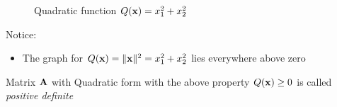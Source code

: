 \begin{frame}
    
    \vspace{2em}
    \begin{figure}
   \begin{center}
    \caption{\label{f:qform_pd} Quadratic function $Q({\mathbf x}) = x_1^2 + x_2^2$ }
   \end{center}
    \end{figure}

\end{frame}

\begin{frame}

    \vspace{2em}
    Notice:
    \begin{itemize}
        \item The graph for $Q({\mathbf x}) = \| {\mathbf x} \|^2 = x_1^2 + x_2^2$ lies everywhere above zero
    \end{itemize}
    
    \vspace{.7em}
    Matrix $\mathbf A$ with Quadratic form with the above property $Q({\mathbf x}) \geq 0$  is called \emph{positive definite}
    
\end{frame}

